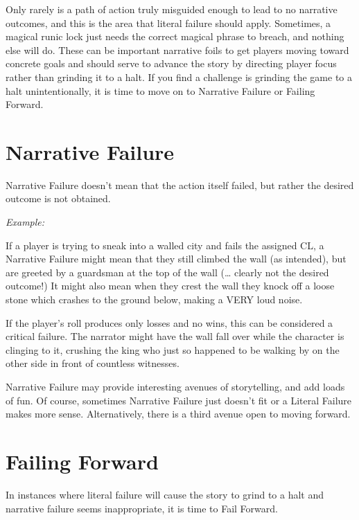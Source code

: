 Only rarely is a path of action truly misguided enough to lead to no narrative outcomes, and this is the area that literal failure should apply. Sometimes, a magical runic lock just needs the correct magical phrase to breach, and nothing else will do. These can be important narrative foils to get players moving toward concrete goals and should serve to advance the story by directing player focus rather than grinding it to a halt. If you find a challenge is grinding the game to a halt unintentionally, it is time to move on to Narrative Failure or Failing Forward.

\section{Narrative Failure} \label{sec:narrative_failure}

Narrative Failure doesn’t mean that the action itself failed, but rather the desired outcome is not obtained.

\textit{Example:}

\begin{displayquote}
    If a player is trying to sneak into a walled city and fails the assigned CL, a Narrative Failure might mean that they still climbed the wall (as intended), but are greeted by a guardsman at the top of the wall (… clearly not the desired outcome!) It might also mean when they crest the wall they knock off a loose stone which crashes to the ground below, making a VERY loud noise.
\end{displayquote}

If the player’s roll produces only losses and no wins, this can be considered a critical failure. The narrator might have the wall fall over while the character is clinging to it, crushing the king who just so happened to be walking by on the other side in front of countless witnesses.

Narrative Failure may provide interesting avenues of storytelling, and add loads of fun. Of course, sometimes Narrative Failure just doesn’t fit or a Literal Failure makes more sense. Alternatively, there is a third avenue open to moving forward.

\section{Failing Forward} \label{Failing Forward}

In instances where literal failure will cause the story to grind to a halt and narrative failure seems inappropriate, it is time to Fail Forward.

